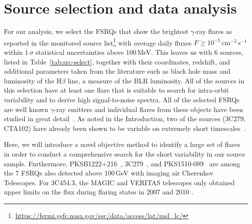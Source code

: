 \documentclass[twocolumn,linenumbers]{aastex62}
\newcommand{\gray}{$\gamma$-ray\xspace}
\begin{document}
\section{Source selection and data analysis}
\label{sec:data}

For our analysis, we select the FSRQs that show the brightest \gray flares as reported in the monitored source list\footnote{\url{https://fermi.gsfc.nasa.gov/ssc/data/access/lat/msl_lc/}}
with average daily fluxes $F \geqslant 10^{-5}\,\mathrm{cm}^{-2}\,\mathrm{s}^{-1}$ within $1\,\sigma$ statistical uncertainties above 100\,MeV.
This leaves us with 6 sources, listed in Table~\ref{tab:src-select}, together with their coordinates, redshift, and additional parameters taken from the literature such as black hole mass and luminosity of the $\mathrm{H}\beta$ line, a measure of the BLR luminosity.  
All of the sources in this selection have at least one 
flare that is suitable
to search for intra-orbit variability and to derive high signal-to-noise spectra. 
All of the selected FSRQs are well known \gray emitters and individual flares from these objects have been studied in great detail~\citep[e.g.,][]{2010ApJ...714L..73A,2011ApJ...733...19T,2015ApJ...808L..48P,TheFermi-LAT:2016dss,2013ApJ...766L..11S,2015ApJ...809..164D,2018ApJ...854L..26S,2018A&A...617A..59K,2019ApJ...871...19Z,2011ApJ...733L..26A}. 
As noted in the Introduction, two of the sources (3C279, CTA102) have already been shown to be variable on extremely short timescales~\citep{TheFermi-LAT:2016dss,2018ApJ...854L..26S}. 

Here, we will introduce a novel objective method to identify a large set of flares in order to conduct a comprehensive search for the short variability in our source sample.  
Furthermore, PKSB1222+216~\citep{2011ApJ...730L...8A}, 3C279~\citep{2008Sci...320.1752M}, and PKS1510-089~\citep{2011ApJ...730L...8A,2013A&A...554A.107H,2014A&A...569A..46A}  are among the 7 FSRQs also detected above 100\,GeV with imaging air Cherenkov Telescopes. 
For 3C454.3, the MAGIC and VERITAS telescopes only obtained upper limits on the flux during flaring states in 2007 \citep{2009A&A...498...83A} and 2010 \citep{2016AJ....151..142A}.
\end{document}
